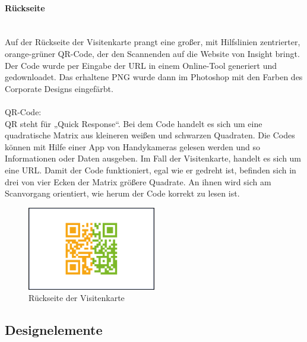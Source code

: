 \paragraph{Rückseite}
\leavevmode \\
Auf der Rückseite der Visitenkarte prangt eine großer, mit Hilfslinien zentrierter, orange-grüner QR-Code, der den Scannenden auf die Website von Insight bringt. Der Code wurde per Eingabe der URL in einem Online-Tool generiert und gedownloadet.\cite{qrc} Das erhaltene PNG wurde dann im Photoshop mit den Farben des Corporate Designs eingefärbt.
\leavevmode \\
\leavevmode \\
QR-Code:  
\leavevmode \\
QR steht für „Quick Response“. Bei dem Code handelt es sich um eine quadratische Matrix aus kleineren weißen und schwarzen Quadraten. Die Codes können mit Hilfe einer App von Handykameras gelesen werden und so Informationen oder Daten ausgeben. Im Fall der Visitenkarte, handelt es sich um eine URL. Damit der Code funktioniert, egal wie er gedreht ist, befinden sich in drei von vier Ecken der Matrix größere Quadrate. An ihnen wird sich am Scanvorgang orientiert, wie herum der Code korrekt zu lesen ist.\cite{qrnutzen}

\begin{figure}[H] 
  \centering
     \includegraphics[width=0.5\textwidth]{design_abb7.png}
  \caption{Rückseite der Visitenkarte}
\end{figure}

\subsection{Designelemente}
